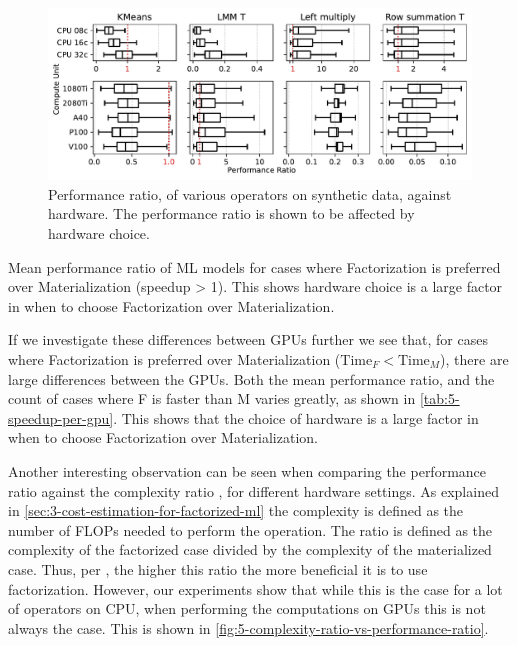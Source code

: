 \begin{figure}[ht]
    \centering
    \includegraphics[width=\linewidth]{chapters/05_cost_estimation/figures/motivation_speedup_per_operator_per_gpu.pdf}
    \caption[Performance ratio plotted against hardware]{Performance ratio, of various operators on synthetic data, against hardware. The performance ratio is shown to be affected by hardware choice.}
    \label{fig:5-gpu-characteristics}
\end{figure}

\begin{table}[ht]
    \centering
    
    \caption[Performance ratio of ML models for cases where factorization has positive impact.]{Mean performance ratio of ML models for cases where Factorization is preferred over Materialization (speedup > 1). This shows hardware choice is a large factor in when to choose Factorization over Materialization.}
    \label{tab:5-speedup-per-gpu}
\end{table}

If we investigate these differences between GPUs further we see that, for cases where Factorization is preferred over Materialization ($\text{Time}_F < \text{Time}_M$), there are large differences between the GPUs. Both the mean performance ratio, and the count of cases where F is faster than M varies greatly, as shown in \autoref{tab:5-speedup-per-gpu}. This shows that the choice of hardware is a large factor in when to choose Factorization over Materialization.

Another interesting observation can be seen when comparing the performance ratio against the complexity ratio \cite{schijndel_cost_estimation}, for different hardware settings. As explained in \autoref{sec:3-cost-estimation-for-factorized-ml} the complexity is defined as the number of FLOPs needed to perform the operation. The ratio is defined as the complexity of the factorized case divided by the complexity of the materialized case. Thus, per \cite{schijndel_cost_estimation}, the higher this ratio the more beneficial it is to use factorization. However, our experiments show that while this is the case for a lot of operators on CPU, when performing the computations on GPUs this is not always the case. This is shown in \autoref{fig:5-complexity-ratio-vs-performance-ratio}.

